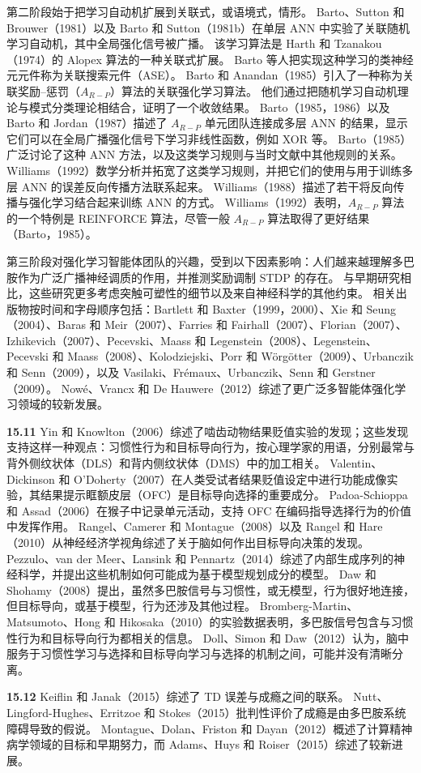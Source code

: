 \documentclass[UTF8,12pt,a4paper,fontset=fandol]{ctexart}
\begin{document}
第二阶段始于把学习自动机扩展到关联式，或语境式，情形。
Barto、Sutton 和 Brouwer（1981）以及 Barto 和 Sutton（1981b）在单层 ANN 中实验了关联随机学习自动机，其中全局强化信号被广播。
该学习算法是 Harth 和 Tzanakou（1974）的 Alopex 算法的一种关联式扩展。
Barto 等人把实现这种学习的类神经元元件称为关联搜索元件（ASE）。
Barto 和 Anandan（1985）引入了一种称为关联奖励--惩罚（$A_{R-P}$）算法的关联强化学习算法。
他们通过把随机学习自动机理论与模式分类理论相结合，证明了一个收敛结果。
Barto（1985，1986）以及 Barto 和 Jordan（1987）描述了 $A_{R-P}$ 单元团队连接成多层 ANN 的结果，显示它们可以在全局广播强化信号下学习非线性函数，例如 XOR 等。
Barto（1985）广泛讨论了这种 ANN 方法，以及这类学习规则与当时文献中其他规则的关系。
Williams（1992）数学分析并拓宽了这类学习规则，并把它们的使用与用于训练多层 ANN 的误差反向传播方法联系起来。
Williams（1988）描述了若干将反向传播与强化学习结合起来训练 ANN 的方式。
Williams（1992）表明，$A_{R-P}$ 算法的一个特例是 REINFORCE 算法，尽管一般 $A_{R-P}$ 算法取得了更好结果（Barto，1985）。

第三阶段对强化学习智能体团队的兴趣，受到以下因素影响：人们越来越理解多巴胺作为广泛广播神经调质的作用，并推测奖励调制 STDP 的存在。
与早期研究相比，这些研究更多考虑突触可塑性的细节以及来自神经科学的其他约束。
相关出版物按时间和字母顺序包括：Bartlett 和 Baxter（1999，2000）、Xie 和 Seung（2004）、Baras 和 Meir（2007）、Farries 和 Fairhall（2007）、Florian（2007）、Izhikevich（2007）、Pecevski、Maass 和 Legenstein（2008）、Legenstein、Pecevski 和 Maass（2008）、Kolodziejski、Porr 和 Wörgötter（2009）、Urbanczik 和 Senn（2009），以及 Vasilaki、Frémaux、Urbanczik、Senn 和 Gerstner（2009）。
Nowé、Vrancx 和 De Hauwere（2012）综述了更广泛多智能体强化学习领域的较新发展。

\noindent\textbf{15.11}
Yin 和 Knowlton（2006）综述了啮齿动物结果贬值实验的发现；这些发现支持这样一种观点：习惯性行为和目标导向行为，按心理学家的用语，分别最常与背外侧纹状体（DLS）和背内侧纹状体（DMS）中的加工相关。
Valentin、Dickinson 和 O'Doherty（2007）在人类受试者结果贬值设定中进行功能成像实验，其结果提示眶额皮层（OFC）是目标导向选择的重要成分。
Padoa-Schioppa 和 Assad（2006）在猴子中记录单元活动，支持 OFC 在编码指导选择行为的价值中发挥作用。
Rangel、Camerer 和 Montague（2008）以及 Rangel 和 Hare（2010）从神经经济学视角综述了关于脑如何作出目标导向决策的发现。
Pezzulo、van der Meer、Lansink 和 Pennartz（2014）综述了内部生成序列的神经科学，并提出这些机制如何可能成为基于模型规划成分的模型。
Daw 和 Shohamy（2008）提出，虽然多巴胺信号与习惯性，或无模型，行为很好地连接，但目标导向，或基于模型，行为还涉及其他过程。
Bromberg-Martin、Matsumoto、Hong 和 Hikosaka（2010）的实验数据表明，多巴胺信号包含与习惯性行为和目标导向行为都相关的信息。
Doll、Simon 和 Daw（2012）认为，脑中服务于习惯性学习与选择和目标导向学习与选择的机制之间，可能并没有清晰分离。

\noindent\textbf{15.12}
Keiflin 和 Janak（2015）综述了 TD 误差与成瘾之间的联系。
Nutt、Lingford-Hughes、Erritzoe 和 Stokes（2015）批判性评价了成瘾是由多巴胺系统障碍导致的假说。
Montague、Dolan、Friston 和 Dayan（2012）概述了计算精神病学领域的目标和早期努力，而 Adams、Huys 和 Roiser（2015）综述了较新进展。
\end{document}
